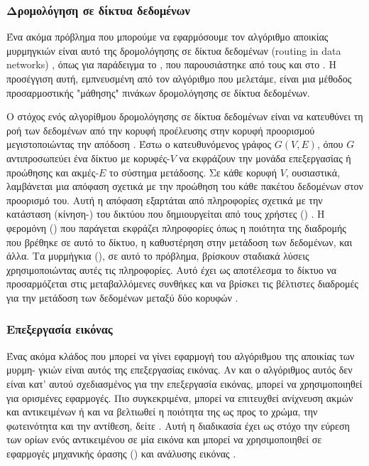 \subsubsection{Δρομολόγηση σε δίκτυα δεδομένων}
Ένα ακόμα πρόβλημα που μπορούμε να εφαρμόσουμε τον αλγόριθμο αποικίας μυρμηγκιών είναι αυτό της δρομολόγησης σε δίκτυα δεδομένων (routing in data networks) \cite{bertsekas1998network, dorigo2003ant, di1998antnet}, όπως για παράδειγμα το , που παρουσιάστηκε από τους  και  στο \cite{di1998antnet}. Η προσέγγιση αυτή, εμπνευσμένη από τον αλγόριθμο που μελετάμε, είναι μια μέθοδος προσαρμοστικής "μάθησης" πινάκων δρομολόγησης σε δίκτυα δεδομένων.

Ο στόχος ενός αλγορίθμου δρομολόγησης σε δίκτυα δεδομένων είναι να κατευθύνει τη ροή των δεδομένων από την κορυφή προέλευσης στην κορυφή προορισμού μεγιστοποιώντας την απόδοση \cite{di1998antnet}. Έστω ο κατευθυνόμενος γράφος $G(V,E)$, όπου $G$ αντιπροσωπεύει ένα δίκτυο με κορυφές-$V$ να εκφράζουν την μονάδα επεξεργασίας ή προώθησης και ακμές-$E$ το σύστημα μετάδοσης. Σε κάθε κορυφή $V$, ουσιαστικά, λαμβάνεται μια απόφαση σχετικά με την προώθηση του κάθε πακέτου δεδομένων στον προορισμό του. Αυτή η απόφαση εξαρτάται από πληροφορίες σχετικά με την κατάσταση (κίνηση-) του δικτύου που δημιουργείται από τους χρήστες () \cite{di1998antnet}. Η φερομόνη () που παράγεται εκφράζει πληροφορίες όπως η ποιότητα της διαδρομής που βρέθηκε σε αυτό το δίκτυο, η καθυστέρηση στην μετάδοση των δεδομένων, και άλλα. Τα μυρμήγκια (), σε αυτό το πρόβλημα, βρίσκουν σταδιακά λύσεις χρησιμοποιώντας αυτές τις πληροφορίες. Αυτό έχει ως αποτέλεσμα το δίκτυο να προσαρμόζεται στις μεταβαλλόμενες συνθήκες και να βρίσκει τις βέλτιστες διαδρομές για την μετάδοση των δεδομένων μεταξύ δύο κορυφών \cite{dorigo2003ant}. 


\subsubsection{Επεξεργασία εικόνας}
Ένας ακόμα κλάδος που μπορεί να γίνει εφαρμογή του αλγόριθμου της αποικίας των μυρμη- γκιών είναι αυτός της επεξεργασίας εικόνας. Αν και ο αλγόριθμος αυτός δεν είναι κατ' αυτού σχεδιασμένος για την επεξεργασία εικόνας, μπορεί να χρησιμοποιηθεί για ορισμένες εφαρμογές. Πιο συγκεκριμένα, μπορεί να επιτευχθεί ανίχνευση ακμών και αντικειμένων ή και να βελτιωθεί η ποιότητα της ως προς το χρώμα, την φωτεινότητα και την αντίθεση, δείτε \cite{mpikou2013euretikoi, nezamabadi2006edge, baterina2010image, tian2008ant}. Αυτή η διαδικασία έχει ως στόχο την εύρεση των ορίων ενός αντικειμένου σε μία εικόνα και μπορεί να χρησιμοποιηθεί σε εφαρμογές μηχανικής όρασης () και ανάλυσης εικόνας \cite{baterina2010image}. 

